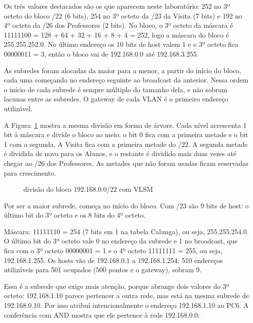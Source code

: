Os três valores destacados são os que aparecem neste laboratório: 252 no 3º octeto do bloco /22 (6 bits), 254 no 3º octeto da /23 da Visita (7 bits) e 192 no 4º octeto da /26 dos Professores (2 bits). No bloco, o 3º octeto da máscara é 11111100 = 128 + 64 + 32 + 16 + 8 + 4 = 252, logo a máscara do bloco é 255.255.252.0. No último endereço os 10 bits de host valem 1 e o 3º octeto fica 00000011 = 3, então o bloco vai de 192.168.0.0 até 192.168.3.255.

As subredes foram alocadas da maior para a menor, a partir do início do bloco, cada uma começando no endereço seguinte ao broadcast da anterior. Nessa ordem o início de cada subrede é sempre múltiplo do tamanho dela, e não sobram lacunas entre as subredes. O gateway de cada VLAN é o primeiro endereço utilizável.

A Figura~\ref{fig:arvore} mostra a mesma divisão em forma de árvore. Cada nível acrescenta 1 bit à máscara e divide o bloco ao meio: o bit 0 fica com a primeira metade e o bit 1 com a segunda. A Visita fica com a primeira metade do /22. A segunda metade é dividida de novo para os Alunos, e o restante é dividido mais duas vezes até chegar ao /26 dos Professores. As metades que não foram usadas ficam reservadas para crescimento.

\begin{figure}[tbp]
\captionsetup{position=top}
\caption{divisão do bloco 192.168.0.0/22 com VLSM}\label{fig:arvore}
\centering
\resizebox{\textwidth}{!}{}
\fonte
\end{figure}


Por ser a maior subrede, começa no início do bloco. Com /23 são 9 bits de host: o último bit do 3º octeto e os 8 bits do 4º octeto.



Máscara: 11111110 = 254 (7 bits em 1 na tabela Calunga), ou seja, 255.255.254.0. O último bit do 3º octeto vale 0 no endereço da subrede e 1 no broadcast, que fica com o 3º octeto 00000001 = 1 e o 4º octeto 11111111 = 255, ou seja, 192.168.1.255. Os hosts vão de 192.168.0.1 a 192.168.1.254: 510 endereços utilizáveis para 501 ocupados (500 pontos e o gateway), sobram 9.

Essa é a subrede que exige mais atenção, porque abrange dois valores do 3º octeto: 192.168.1.10 parece pertencer a outra rede, mas está na mesma subrede de 192.168.0.10. Por isso atribuí intencionalmente o endereço 192.168.1.10 ao PC6. A conferência com AND mostra que ele pertence à rede 192.168.0.0:

